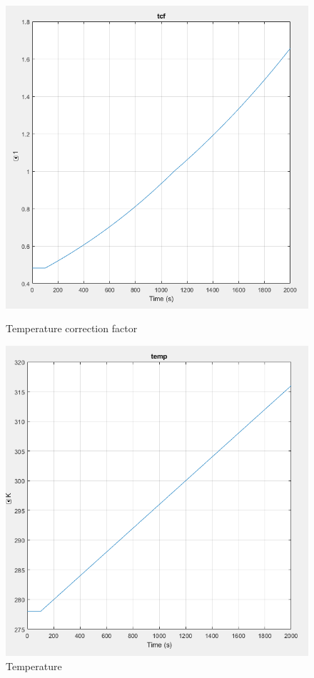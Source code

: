 \begin{figure}[h]
\centering
\begin{minipage}{.5\textwidth}
    \centering
    \includegraphics[width=\textwidth]{tcf.PNG}
    \caption{Temperature correction factor}
    \label{fig:tcf}
\end{minipage}
\begin{minipage}{.5\textwidth}
  \centering
  \includegraphics[width=\linewidth]{temp.PNG}
  \caption{Temperature}
  \label{fig:temp}
\end{minipage}
\end{figure}


